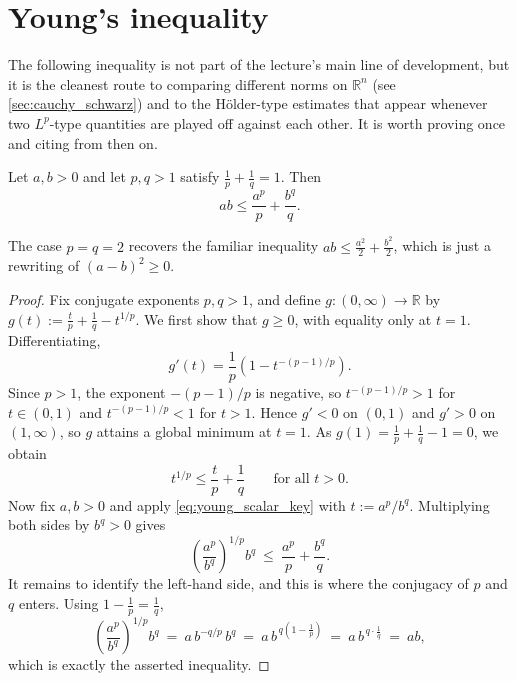 \section{Young's inequality}
\label{sec:youngs_inequality}

The following inequality is not part of the lecture's main line of development, but it is the
cleanest route to comparing different norms on $\mathbb{R}^n$ (see \cref{sec:cauchy_schwarz}) and
to the Hölder-type estimates that appear whenever two $L^p$-type quantities are played off against
each other. It is worth proving once and citing from then on.

\begin{proposition}
\label{prop:youngs_inequality}
Let $a, b > 0$ and let $p, q > 1$ satisfy $\tfrac{1}{p} + \tfrac{1}{q} = 1$. Then
\[
  ab \leq \frac{a^p}{p} + \frac{b^q}{q}.
\]
\end{proposition}

\begin{remark}
The case $p = q = 2$ recovers the familiar inequality $ab \leq \tfrac{a^2}{2} + \tfrac{b^2}{2}$,
which is just a rewriting of $(a-b)^2 \geq 0$.
\end{remark}

\begin{proof}
Fix conjugate exponents $p, q > 1$, and define $g : (0,\infty) \to \mathbb{R}$ by
$g(t) := \tfrac{t}{p} + \tfrac{1}{q} - t^{1/p}$. We first show that $g \geq 0$, with equality only
at $t = 1$. Differentiating,
\[
  g'(t) = \frac{1}{p}\left(1 - t^{-(p-1)/p}\right).
\]
Since $p > 1$, the exponent $-(p-1)/p$ is negative, so $t^{-(p-1)/p} > 1$ for $t \in (0,1)$ and
$t^{-(p-1)/p} < 1$ for $t > 1$. Hence $g' < 0$ on $(0,1)$ and $g' > 0$ on $(1,\infty)$, so $g$
attains a global minimum at $t = 1$. As $g(1) = \tfrac{1}{p} + \tfrac{1}{q} - 1 = 0$, we obtain
\begin{equation}
\label{eq:young_scalar_key}
  t^{1/p} \leq \frac{t}{p} + \frac{1}{q} \qquad \text{for all } t > 0.
\end{equation}
Now fix $a, b > 0$ and apply \eqref{eq:young_scalar_key} with $t := a^p / b^q$. Multiplying both
sides by $b^q > 0$ gives
\[
  \left(\frac{a^p}{b^q}\right)^{1/p} b^q \ \leq\ \frac{a^p}{p} + \frac{b^q}{q}.
\]
It remains to identify the left-hand side, and this is where the conjugacy of $p$ and $q$ enters.
Using $1 - \tfrac{1}{p} = \tfrac{1}{q}$,
\[
  \left(\frac{a^p}{b^q}\right)^{1/p} b^q
    \ =\ a\,b^{-q/p}\,b^{q}
    \ =\ a\,b^{\,q\left(1 - \frac{1}{p}\right)}
    \ =\ a\,b^{\,q \cdot \frac{1}{q}}
    \ =\ ab,
\]
which is exactly the asserted inequality.
\end{proof}

